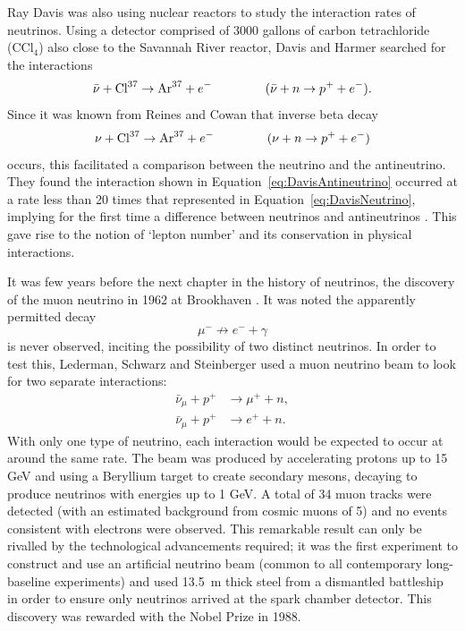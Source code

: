 Ray Davis was also using nuclear reactors to study the interaction rates of neutrinos.  Using a detector comprised of 3000 gallons of carbon tetrachloride (CCl$_4$) also close to the Savannah River reactor, Davis and Harmer searched for the interactions
\begin{equation}\label{eq:DavisAntineutrino}
  \bar{\nu} + \textnormal{Cl}^{37} \rightarrow \textnormal{Ar}^{37} + e^- \hspace{1.5cm} (\bar{\nu} + n \rightarrow p^+ + e^-).
\end{equation}
Since it was known from Reines and Cowan that inverse beta decay
\begin{equation}\label{eq:DavisNeutrino}
  \nu + \textnormal{Cl}^{37} \rightarrow \textnormal{Ar}^{37} + e^- \hspace{1.5cm} (\nu + n \rightarrow p^+ + e^-)
\end{equation}
occurs, this facilitated a comparison between the neutrino and the antineutrino.  They found the interaction shown in Equation~\ref{eq:DavisAntineutrino} occurred at a rate less than 20 times that represented in Equation~\ref{eq:DavisNeutrino}, implying for the first time a difference between neutrinos and antineutrinos \cite{Davis1959}.  This gave rise to the notion of `lepton number' and its conservation in physical interactions.

It was few years before the next chapter in the history of neutrinos, the discovery of the muon neutrino in 1962 at Brookhaven \cite{Danby1962}.  It was noted the apparently permitted decay
\begin{equation}
\mu^- \not\rightarrow e^- + \gamma
\end{equation}
is never observed, inciting the possibility of two distinct neutrinos.  In order to test this, Lederman, Schwarz and Steinberger used a muon neutrino beam to look for two separate interactions:
\begin{align}
  \bar{\nu}_{\mu} + p^+ &\rightarrow \mu^+ + n, \\
  \bar{\nu}_{\mu} + p^+ &\rightarrow e^+ + n.
\end{align}
With only one type of neutrino, each interaction would be expected to occur at around the same rate.  The beam was produced by accelerating protons up to 15 GeV and using a Beryllium target to create secondary mesons, decaying to produce neutrinos with energies up to 1 GeV.  A total of 34 muon tracks were detected (with an estimated background from cosmic muons of 5) and no events consistent with electrons were observed.  This remarkable result can only be rivalled by the technological advancements required; it was the first experiment to construct and use an artificial neutrino beam (common to all contemporary long-baseline experiments) and used 13.5~m thick steel from a dismantled battleship in order to ensure only neutrinos arrived at the spark chamber detector.  This discovery was rewarded with the Nobel Prize in 1988.

